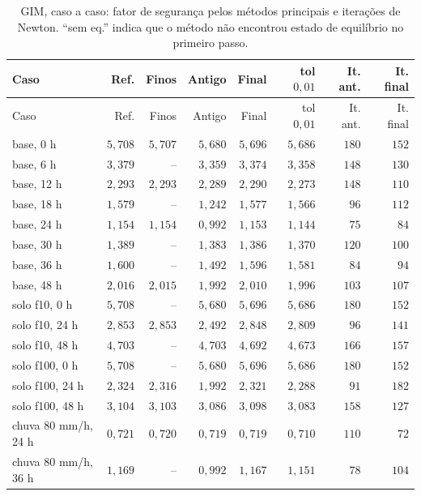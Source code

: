 \documentclass[11pt,a4paper]{article}
\numberwithin{equation}{section}
\begin{document}
{\footnotesize
\begin{longtable}{lrrrrrrr}
\caption{GIM, caso a caso: fator de segurança pelos métodos principais e iterações de Newton. ``sem eq.'' indica que o método não encontrou estado de equilíbrio no primeiro passo.}\label{tab:casos_gim}\\
\toprule
Caso & Ref. & Finos & Antigo & Final & tol $0{,}01$ & It. ant. & It. final \\
\midrule
\endfirsthead
\toprule
Caso & Ref. & Finos & Antigo & Final & tol $0{,}01$ & It. ant. & It. final \\
\midrule
\endhead
\bottomrule
\endfoot
base, 0 h & $5{,}708$ & $5{,}707$ & $5{,}680$ & $5{,}696$ & $5{,}686$ & $180$ & $152$ \\
base, 6 h & $3{,}379$ & -- & $3{,}359$ & $3{,}374$ & $3{,}358$ & $148$ & $130$ \\
base, 12 h & $2{,}293$ & $2{,}293$ & $2{,}289$ & $2{,}290$ & $2{,}273$ & $148$ & $110$ \\
base, 18 h & $1{,}579$ & -- & $1{,}242$ & $1{,}577$ & $1{,}566$ & $96$ & $112$ \\
base, 24 h & $1{,}154$ & $1{,}154$ & $0{,}992$ & $1{,}153$ & $1{,}144$ & $75$ & $84$ \\
base, 30 h & $1{,}389$ & -- & $1{,}383$ & $1{,}386$ & $1{,}370$ & $120$ & $100$ \\
base, 36 h & $1{,}600$ & -- & $1{,}492$ & $1{,}596$ & $1{,}581$ & $84$ & $94$ \\
base, 48 h & $2{,}016$ & $2{,}015$ & $1{,}992$ & $2{,}010$ & $1{,}996$ & $103$ & $107$ \\
solo f10, 0 h & $5{,}708$ & -- & $5{,}680$ & $5{,}696$ & $5{,}686$ & $180$ & $152$ \\
solo f10, 24 h & $2{,}853$ & $2{,}853$ & $2{,}492$ & $2{,}848$ & $2{,}809$ & $96$ & $141$ \\
solo f10, 48 h & $4{,}703$ & -- & $4{,}703$ & $4{,}692$ & $4{,}673$ & $166$ & $157$ \\
solo f100, 0 h & $5{,}708$ & -- & $5{,}680$ & $5{,}696$ & $5{,}686$ & $180$ & $152$ \\
solo f100, 24 h & $2{,}324$ & $2{,}316$ & $1{,}992$ & $2{,}321$ & $2{,}288$ & $91$ & $182$ \\
solo f100, 48 h & $3{,}104$ & $3{,}103$ & $3{,}086$ & $3{,}098$ & $3{,}083$ & $158$ & $127$ \\
chuva 80 mm/h, 24 h & $0{,}721$ & $0{,}720$ & $0{,}719$ & $0{,}719$ & $0{,}710$ & $110$ & $72$ \\
chuva 80 mm/h, 36 h & $1{,}169$ & -- & $0{,}992$ & $1{,}167$ & $1{,}151$ & $78$ & $104$ \\

\end{longtable}}
\end{document}
